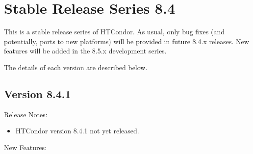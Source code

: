 
\section{\label{sec:History-8-4}Stable Release Series 8.4}

This is a stable release series of HTCondor.
As usual, only bug fixes (and potentially, ports to new platforms)
will be provided in future 8.4.x releases.
New features will be added in the 8.5.x development series.

The details of each version are described below.


\subsection*{\label{sec:New-8-4-1}Version 8.4.1}

\noindent Release Notes:

\begin{itemize}

\item HTCondor version 8.4.1 not yet released.

\end{itemize}

\noindent New Features:

